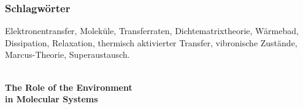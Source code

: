 \documentclass[12pt,twoside,a4paper]{report}
\begin{document}
\subsubsection*{Schlagw\"orter}
Elektronentransfer, Molek\"ule, Transferraten, Dichtematrixtheorie,
W\"armebad, Dissipation, Relaxation, thermisch aktivierter Transfer,
vibronische Zust\"ande, 
Marcus-Theorie, Superaustausch.

\newpage\thispagestyle{empty}
\\[4cm]
{\huge\bf The Role of the Environment \\[1.7ex]
in Molecular Systems}



\tableofcontents

{\protect{}}\listoffigures

{\protect{}}\listoftables

\setcounter{secnumdepth}{-1}
\setcounter{tocdepth}{-1}

{\protect{}}
\end{document}
